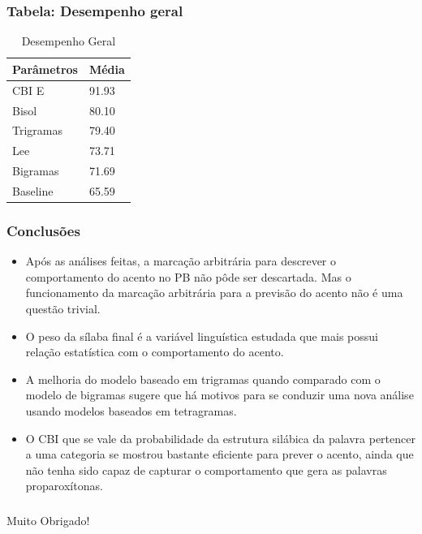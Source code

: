 \documentclass[xcolor=table]{beamer}
\begin{document}
	\begin{frame}
		\frametitle{Tabela: Desempenho geral}
		\begin{table}[]
			\centering
			\caption{Desempenho Geral}
			\label{my-label}
			\begin{tabular}{@{}ll@{}}
				\toprule
				Parâmetros & Média \\ \midrule
				CBI E    & 91.93 \\
				Bisol      & 80.10 \\
				Trigramas  & 79.40 \\
				Lee        & 73.71 \\
				Bigramas   & 71.69 \\
				Baseline   & 65.59 \\ \bottomrule
			\end{tabular}
		\end{table}
	\end{frame}
	
	
	\begin{frame}
		\frametitle{Conclusões}
		\begin{itemize}
			\item Após as análises feitas, a marcação arbitrária para descrever o comportamento do acento no PB não pôde ser descartada. Mas o funcionamento da marcação arbitrária para a previsão do acento não é uma questão trivial.\\
			\item O peso da sílaba final é a variável linguística estudada que mais possui relação estatística com o comportamento do acento.\\
			\item A melhoria do modelo baseado em trigramas quando comparado com o modelo de bigramas sugere que há motivos para se conduzir uma nova análise usando modelos baseados em tetragramas.\\
			\item O CBI que se vale da probabilidade da estrutura silábica da palavra pertencer a uma categoria se mostrou bastante eficiente para prever o acento, ainda que não tenha sido capaz de capturar o comportamento que gera as palavras proparoxítonas.\\
			
		\end{itemize}
		
	\end{frame}
	

	\begin{frame}
		\frametitle{}
		Muito Obrigado!
		
	\end{frame}
\end{document}
